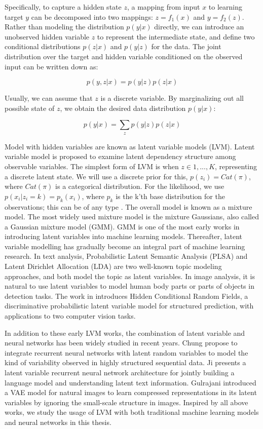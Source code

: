 Specifically, to capture a hidden state $z$, a mapping from input $x$ to learning target $y$ can be decomposed into two mappings: $z=f_1(x)$ and $y=f_2(z)$. Rather than modeling the distribution $p(y|x)$ directly, we can introduce an unobserved hidden variable $z$ to represent the intermediate state, and define two conditional distributions $p(z|x)$ and $p(y|z)$ for the data. The joint distribution over the target and hidden variable conditioned on the observed input can be written down as:

\[p(y,z|x) = p(y|z)p(z|x)\]

Usually, we can assume that $z$ is a discrete variable. By marginalizing out all possible state of $z$, we obtain the desired data distribution $p(y|x)$:

\[p(y|x) = \sum_z p(y|z)p(z|x)\] \label{eq2}

Model with hidden variables are known as latent variable models (LVM). Latent variable model is proposed to examine latent dependency structure among observable variables. The simplest form of LVM is when $z\in{1,...,K}$, representing a discrete latent state. We will use a discrete prior for this, $p(z_i)=Cat(\pi)$, where $Cat(\pi)$ is a categorical distribution. For the likelihood, we use $p(x_i|z_i=k)=p_k(x_i)$, where $p_k$ is the k'th base distribution for the observations; this can be of any type \cite{murphy2012machine}. The overall model is known as a mixture model. The most widely used mixture model is the mixture Gaussians, also called a Gaussian mixture model (GMM). GMM is one of the most early works in introducing latent variables into machine learning models. Thereafter, latent variable modelling has gradually become an integral part of machine learning research. In text analysis, Probabilistic Latent Semantic Analysis (PLSA) \cite{hofmann2013probabilistic2} and Latent Dirichlet Allocation (LDA) \cite{blei2003latent} are two well-known topic modeling approaches, and both model the topic as latent variables. In image analysis, it is natural to use latent variables to model human body parts or parts of objects in detection tasks. The work in \cite{wang2006hidden} introduces Hidden Conditional Random Fields, a discriminative probabilistic latent variable model for structured prediction, with applications to two computer vision tasks. 

In addition to these early LVM works, the combination of latent variable and neural networks has been widely studied in recent years. Chung \cite{chung2015recurrent} propose to integrate recurrent neural networks with latent random variables to model the kind of variability observed in highly structured sequential data. Ji \cite{ji2016latent2} presents a latent variable recurrent neural network architecture for jointly building a language model and understanding latent text information. Gulrajani \cite{gulrajani2016pixelvae2} introduced a VAE model for natural images to learn compressed representations in its latent variables by ignoring the small-scale structure in images. Inspired by all above works, we study the usage of LVM with both traditional machine learning models and neural networks in this thesis.

